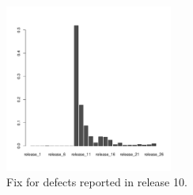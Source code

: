 \begin{figure}[thb!]
      \caption{Fix for defects reported in release 10.}
      \label{fig:defect_release_10}
      \includegraphics[width=0.49\textwidth]{figures/r10}
\end{figure}
